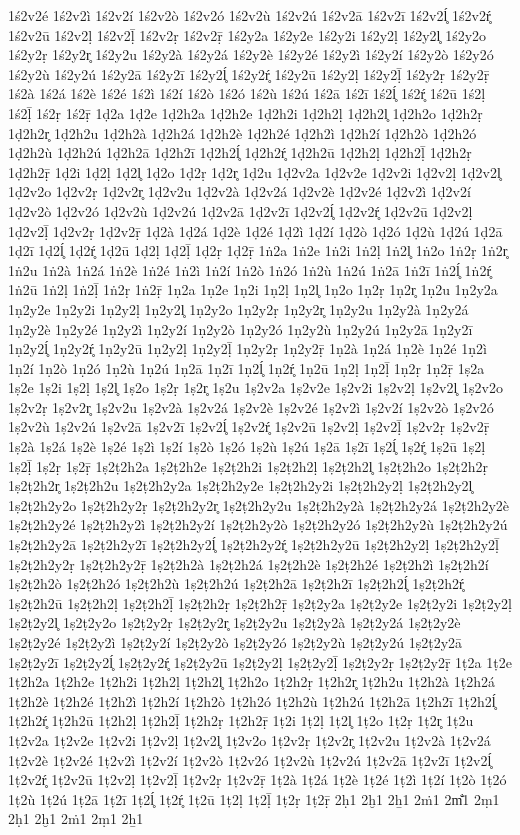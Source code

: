 {1ś2v2é
1ś2v2ì
1ś2v2í
1ś2v2ò
1ś2v2ó
1ś2v2ù
1ś2v2ú
1ś2v2ā
1ś2v2ī
1ś2v2ĺ̥
1ś2v2ŕ̥
1ś2v2ū
1ś2v2ḷ
1ś2v2ḹ
1ś2v2ṛ
1ś2v2ṝ
1ś2y2a
1ś2y2e
1ś2y2i
1ś2y2ḷ
1ś2y2l̥
1ś2y2o
1ś2y2ṛ
1ś2y2r̥
1ś2y2u
1ś2y2à
1ś2y2á
1ś2y2è
1ś2y2é
1ś2y2ì
1ś2y2í
1ś2y2ò
1ś2y2ó
1ś2y2ù
1ś2y2ú
1ś2y2ā
1ś2y2ī
1ś2y2ĺ̥
1ś2y2ŕ̥
1ś2y2ū
1ś2y2ḷ
1ś2y2ḹ
1ś2y2ṛ
1ś2y2ṝ
1ś2à
1ś2á
1ś2è
1ś2é
1ś2ì
1ś2í
1ś2ò
1ś2ó
1ś2ù
1ś2ú
1ś2ā
1ś2ī
1ś2ĺ̥
1ś2ŕ̥
1ś2ū
1ś2ḷ
1ś2ḹ
1ś2ṛ
1ś2ṝ
1ḍ2a
1ḍ2e
1ḍ2h2a
1ḍ2h2e
1ḍ2h2i
1ḍ2h2ḷ
1ḍ2h2l̥
1ḍ2h2o
1ḍ2h2ṛ
1ḍ2h2r̥
1ḍ2h2u
1ḍ2h2à
1ḍ2h2á
1ḍ2h2è
1ḍ2h2é
1ḍ2h2ì
1ḍ2h2í
1ḍ2h2ò
1ḍ2h2ó
1ḍ2h2ù
1ḍ2h2ú
1ḍ2h2ā
1ḍ2h2ī
1ḍ2h2ĺ̥
1ḍ2h2ŕ̥
1ḍ2h2ū
1ḍ2h2ḷ
1ḍ2h2ḹ
1ḍ2h2ṛ
1ḍ2h2ṝ
1ḍ2i
1ḍ2ḷ
1ḍ2l̥
1ḍ2o
1ḍ2ṛ
1ḍ2r̥
1ḍ2u
1ḍ2v2a
1ḍ2v2e
1ḍ2v2i
1ḍ2v2ḷ
1ḍ2v2l̥
1ḍ2v2o
1ḍ2v2ṛ
1ḍ2v2r̥
1ḍ2v2u
1ḍ2v2à
1ḍ2v2á
1ḍ2v2è
1ḍ2v2é
1ḍ2v2ì
1ḍ2v2í
1ḍ2v2ò
1ḍ2v2ó
1ḍ2v2ù
1ḍ2v2ú
1ḍ2v2ā
1ḍ2v2ī
1ḍ2v2ĺ̥
1ḍ2v2ŕ̥
1ḍ2v2ū
1ḍ2v2ḷ
1ḍ2v2ḹ
1ḍ2v2ṛ
1ḍ2v2ṝ
1ḍ2à
1ḍ2á
1ḍ2è
1ḍ2é
1ḍ2ì
1ḍ2í
1ḍ2ò
1ḍ2ó
1ḍ2ù
1ḍ2ú
1ḍ2ā
1ḍ2ī
1ḍ2ĺ̥
1ḍ2ŕ̥
1ḍ2ū
1ḍ2ḷ
1ḍ2ḹ
1ḍ2ṛ
1ḍ2ṝ
1ṅ2a
1ṅ2e
1ṅ2i
1ṅ2ḷ
1ṅ2l̥
1ṅ2o
1ṅ2ṛ
1ṅ2r̥
1ṅ2u
1ṅ2à
1ṅ2á
1ṅ2è
1ṅ2é
1ṅ2ì
1ṅ2í
1ṅ2ò
1ṅ2ó
1ṅ2ù
1ṅ2ú
1ṅ2ā
1ṅ2ī
1ṅ2ĺ̥
1ṅ2ŕ̥
1ṅ2ū
1ṅ2ḷ
1ṅ2ḹ
1ṅ2ṛ
1ṅ2ṝ
1ṇ2a
1ṇ2e
1ṇ2i
1ṇ2ḷ
1ṇ2l̥
1ṇ2o
1ṇ2ṛ
1ṇ2r̥
1ṇ2u
1ṇ2y2a
1ṇ2y2e
1ṇ2y2i
1ṇ2y2ḷ
1ṇ2y2l̥
1ṇ2y2o
1ṇ2y2ṛ
1ṇ2y2r̥
1ṇ2y2u
1ṇ2y2à
1ṇ2y2á
1ṇ2y2è
1ṇ2y2é
1ṇ2y2ì
1ṇ2y2í
1ṇ2y2ò
1ṇ2y2ó
1ṇ2y2ù
1ṇ2y2ú
1ṇ2y2ā
1ṇ2y2ī
1ṇ2y2ĺ̥
1ṇ2y2ŕ̥
1ṇ2y2ū
1ṇ2y2ḷ
1ṇ2y2ḹ
1ṇ2y2ṛ
1ṇ2y2ṝ
1ṇ2à
1ṇ2á
1ṇ2è
1ṇ2é
1ṇ2ì
1ṇ2í
1ṇ2ò
1ṇ2ó
1ṇ2ù
1ṇ2ú
1ṇ2ā
1ṇ2ī
1ṇ2ĺ̥
1ṇ2ŕ̥
1ṇ2ū
1ṇ2ḷ
1ṇ2ḹ
1ṇ2ṛ
1ṇ2ṝ
1ṣ2a
1ṣ2e
1ṣ2i
1ṣ2ḷ
1ṣ2l̥
1ṣ2o
1ṣ2ṛ
1ṣ2r̥
1ṣ2u
1ṣ2v2a
1ṣ2v2e
1ṣ2v2i
1ṣ2v2ḷ
1ṣ2v2l̥
1ṣ2v2o
1ṣ2v2ṛ
1ṣ2v2r̥
1ṣ2v2u
1ṣ2v2à
1ṣ2v2á
1ṣ2v2è
1ṣ2v2é
1ṣ2v2ì
1ṣ2v2í
1ṣ2v2ò
1ṣ2v2ó
1ṣ2v2ù
1ṣ2v2ú
1ṣ2v2ā
1ṣ2v2ī
1ṣ2v2ĺ̥
1ṣ2v2ŕ̥
1ṣ2v2ū
1ṣ2v2ḷ
1ṣ2v2ḹ
1ṣ2v2ṛ
1ṣ2v2ṝ
1ṣ2à
1ṣ2á
1ṣ2è
1ṣ2é
1ṣ2ì
1ṣ2í
1ṣ2ò
1ṣ2ó
1ṣ2ù
1ṣ2ú
1ṣ2ā
1ṣ2ī
1ṣ2ĺ̥
1ṣ2ŕ̥
1ṣ2ū
1ṣ2ḷ
1ṣ2ḹ
1ṣ2ṛ
1ṣ2ṝ
1ṣ2ṭ2h2a
1ṣ2ṭ2h2e
1ṣ2ṭ2h2i
1ṣ2ṭ2h2ḷ
1ṣ2ṭ2h2l̥
1ṣ2ṭ2h2o
1ṣ2ṭ2h2ṛ
1ṣ2ṭ2h2r̥
1ṣ2ṭ2h2u
1ṣ2ṭ2h2y2a
1ṣ2ṭ2h2y2e
1ṣ2ṭ2h2y2i
1ṣ2ṭ2h2y2ḷ
1ṣ2ṭ2h2y2l̥
1ṣ2ṭ2h2y2o
1ṣ2ṭ2h2y2ṛ
1ṣ2ṭ2h2y2r̥
1ṣ2ṭ2h2y2u
1ṣ2ṭ2h2y2à
1ṣ2ṭ2h2y2á
1ṣ2ṭ2h2y2è
1ṣ2ṭ2h2y2é
1ṣ2ṭ2h2y2ì
1ṣ2ṭ2h2y2í
1ṣ2ṭ2h2y2ò
1ṣ2ṭ2h2y2ó
1ṣ2ṭ2h2y2ù
1ṣ2ṭ2h2y2ú
1ṣ2ṭ2h2y2ā
1ṣ2ṭ2h2y2ī
1ṣ2ṭ2h2y2ĺ̥
1ṣ2ṭ2h2y2ŕ̥
1ṣ2ṭ2h2y2ū
1ṣ2ṭ2h2y2ḷ
1ṣ2ṭ2h2y2ḹ
1ṣ2ṭ2h2y2ṛ
1ṣ2ṭ2h2y2ṝ
1ṣ2ṭ2h2à
1ṣ2ṭ2h2á
1ṣ2ṭ2h2è
1ṣ2ṭ2h2é
1ṣ2ṭ2h2ì
1ṣ2ṭ2h2í
1ṣ2ṭ2h2ò
1ṣ2ṭ2h2ó
1ṣ2ṭ2h2ù
1ṣ2ṭ2h2ú
1ṣ2ṭ2h2ā
1ṣ2ṭ2h2ī
1ṣ2ṭ2h2ĺ̥
1ṣ2ṭ2h2ŕ̥
1ṣ2ṭ2h2ū
1ṣ2ṭ2h2ḷ
1ṣ2ṭ2h2ḹ
1ṣ2ṭ2h2ṛ
1ṣ2ṭ2h2ṝ
1ṣ2ṭ2y2a
1ṣ2ṭ2y2e
1ṣ2ṭ2y2i
1ṣ2ṭ2y2ḷ
1ṣ2ṭ2y2l̥
1ṣ2ṭ2y2o
1ṣ2ṭ2y2ṛ
1ṣ2ṭ2y2r̥
1ṣ2ṭ2y2u
1ṣ2ṭ2y2à
1ṣ2ṭ2y2á
1ṣ2ṭ2y2è
1ṣ2ṭ2y2é
1ṣ2ṭ2y2ì
1ṣ2ṭ2y2í
1ṣ2ṭ2y2ò
1ṣ2ṭ2y2ó
1ṣ2ṭ2y2ù
1ṣ2ṭ2y2ú
1ṣ2ṭ2y2ā
1ṣ2ṭ2y2ī
1ṣ2ṭ2y2ĺ̥
1ṣ2ṭ2y2ŕ̥
1ṣ2ṭ2y2ū
1ṣ2ṭ2y2ḷ
1ṣ2ṭ2y2ḹ
1ṣ2ṭ2y2ṛ
1ṣ2ṭ2y2ṝ
1ṭ2a
1ṭ2e
1ṭ2h2a
1ṭ2h2e
1ṭ2h2i
1ṭ2h2ḷ
1ṭ2h2l̥
1ṭ2h2o
1ṭ2h2ṛ
1ṭ2h2r̥
1ṭ2h2u
1ṭ2h2à
1ṭ2h2á
1ṭ2h2è
1ṭ2h2é
1ṭ2h2ì
1ṭ2h2í
1ṭ2h2ò
1ṭ2h2ó
1ṭ2h2ù
1ṭ2h2ú
1ṭ2h2ā
1ṭ2h2ī
1ṭ2h2ĺ̥
1ṭ2h2ŕ̥
1ṭ2h2ū
1ṭ2h2ḷ
1ṭ2h2ḹ
1ṭ2h2ṛ
1ṭ2h2ṝ
1ṭ2i
1ṭ2ḷ
1ṭ2l̥
1ṭ2o
1ṭ2ṛ
1ṭ2r̥
1ṭ2u
1ṭ2v2a
1ṭ2v2e
1ṭ2v2i
1ṭ2v2ḷ
1ṭ2v2l̥
1ṭ2v2o
1ṭ2v2ṛ
1ṭ2v2r̥
1ṭ2v2u
1ṭ2v2à
1ṭ2v2á
1ṭ2v2è
1ṭ2v2é
1ṭ2v2ì
1ṭ2v2í
1ṭ2v2ò
1ṭ2v2ó
1ṭ2v2ù
1ṭ2v2ú
1ṭ2v2ā
1ṭ2v2ī
1ṭ2v2ĺ̥
1ṭ2v2ŕ̥
1ṭ2v2ū
1ṭ2v2ḷ
1ṭ2v2ḹ
1ṭ2v2ṛ
1ṭ2v2ṝ
1ṭ2à
1ṭ2á
1ṭ2è
1ṭ2é
1ṭ2ì
1ṭ2í
1ṭ2ò
1ṭ2ó
1ṭ2ù
1ṭ2ú
1ṭ2ā
1ṭ2ī
1ṭ2ĺ̥
1ṭ2ŕ̥
1ṭ2ū
1ṭ2ḷ
1ṭ2ḹ
1ṭ2ṛ
1ṭ2ṝ
2ḥ1
2ḫ1
2ẖ1
2ṁ1
2m̐1
2ṃ1
2ḥ1
2ḫ1
2ṁ1
2ṃ1
2ẖ1
}
\endgroup
